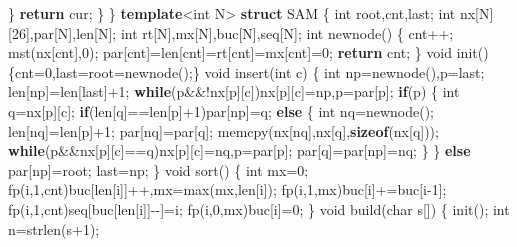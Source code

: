\documentclass[
]{article}
\newenvironment{Shaded}{}{}
\newcommand{\ControlFlowTok}[1]{\textcolor[rgb]{0.00,0.44,0.13}{\textbf{#1}}}
\newcommand{\DataTypeTok}[1]{\textcolor[rgb]{0.56,0.13,0.00}{#1}}
\newcommand{\DecValTok}[1]{\textcolor[rgb]{0.25,0.63,0.44}{#1}}
\newcommand{\KeywordTok}[1]{\textcolor[rgb]{0.00,0.44,0.13}{\textbf{#1}}}
\newcommand{\NormalTok}[1]{#1}
\begin{document}
\begin{Shaded}
\begin{Highlighting}[]
\NormalTok{        \}}
        \ControlFlowTok{return}\NormalTok{ cur;}
\NormalTok{    \}}
\NormalTok{\}}
\KeywordTok{template}\NormalTok{\textless{}}\DataTypeTok{int}\NormalTok{ N\textgreater{}}
\KeywordTok{struct}\NormalTok{ SAM}
\NormalTok{\{}
    \DataTypeTok{int}\NormalTok{ root,cnt,last;}
    \DataTypeTok{int}\NormalTok{ nx[N][}\DecValTok{26}\NormalTok{],par[N],len[N];}
    \DataTypeTok{int}\NormalTok{ rt[N],mx[N],buc[N],seq[N];}
    \DataTypeTok{int}\NormalTok{ newnode()}
\NormalTok{    \{}
\NormalTok{        cnt++;}
\NormalTok{        mst(nx[cnt],}\DecValTok{0}\NormalTok{);}
\NormalTok{        par[cnt]=len[cnt]=rt[cnt]=mx[cnt]=}\DecValTok{0}\NormalTok{;    }
        \ControlFlowTok{return}\NormalTok{ cnt;}
\NormalTok{    \}}
    \DataTypeTok{void}\NormalTok{ init()\{cnt=}\DecValTok{0}\NormalTok{,last=root=newnode();\}}
    \DataTypeTok{void}\NormalTok{ insert(}\DataTypeTok{int}\NormalTok{ c)}
\NormalTok{    \{}
        \DataTypeTok{int}\NormalTok{ np=newnode(),p=last;}
\NormalTok{        len[np]=len[last]+}\DecValTok{1}\NormalTok{;}
        \ControlFlowTok{while}\NormalTok{(p\&\&!nx[p][c])nx[p][c]=np,p=par[p];}
        \ControlFlowTok{if}\NormalTok{(p)}
\NormalTok{        \{}
            \DataTypeTok{int}\NormalTok{ q=nx[p][c];}
            \ControlFlowTok{if}\NormalTok{(len[q]==len[p]+}\DecValTok{1}\NormalTok{)par[np]=q;}
            \ControlFlowTok{else}
\NormalTok{            \{}
                \DataTypeTok{int}\NormalTok{ nq=newnode();}
\NormalTok{                len[nq]=len[p]+}\DecValTok{1}\NormalTok{;}
\NormalTok{                par[nq]=par[q];}
\NormalTok{                memcpy(nx[nq],nx[q],}\KeywordTok{sizeof}\NormalTok{(nx[q]));}
                \ControlFlowTok{while}\NormalTok{(p\&\&nx[p][c]==q)nx[p][c]=nq,p=par[p];}
\NormalTok{                par[q]=par[np]=nq;}
\NormalTok{            \}}
\NormalTok{        \}}
        \ControlFlowTok{else}\NormalTok{ par[np]=root;}
\NormalTok{        last=np;}
\NormalTok{    \}}
    \DataTypeTok{void}\NormalTok{ sort()}
\NormalTok{    \{}
        \DataTypeTok{int}\NormalTok{ mx=}\DecValTok{0}\NormalTok{;}
\NormalTok{        fp(i,}\DecValTok{1}\NormalTok{,cnt)buc[len[i]]++,mx=max(mx,len[i]);}
\NormalTok{        fp(i,}\DecValTok{1}\NormalTok{,mx)buc[i]+=buc[i{-}}\DecValTok{1}\NormalTok{];}
\NormalTok{        fp(i,}\DecValTok{1}\NormalTok{,cnt)seq[buc[len[i]]{-}{-}]=i;}
\NormalTok{        fp(i,}\DecValTok{0}\NormalTok{,mx)buc[i]=}\DecValTok{0}\NormalTok{;}
\NormalTok{    \}}
    \DataTypeTok{void}\NormalTok{ build(}\DataTypeTok{char}\NormalTok{ s[])}
\NormalTok{    \{}
\NormalTok{        init();}
        \DataTypeTok{int}\NormalTok{ n=strlen(s+}\DecValTok{1}\NormalTok{);}

\end{Highlighting}
\end{Shaded}
\end{document}
